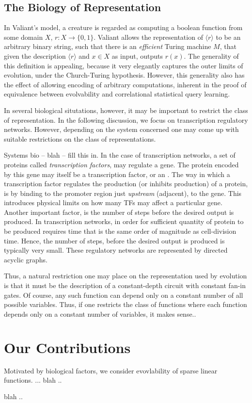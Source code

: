 \subsection{The Biology of Representation}

In Valiant's model, a creature is regarded as computing a boolean function from
some domain $X$, $r : X \rightarrow \{0, 1\}$. Valiant allows the representation
of $\langle r \rangle$ to be an arbitrary binary string, such that there is an
\emph{efficient} Turing machine $M$, that given the description $\langle r
\rangle$ and $x \in X$ as input, outputs $r(x)$. The generality of this
definition is appealing, because it very elegantly captures the outer limits of
evolution, under the Church-Turing hypothesis. However, this generality also has
the effect of allowing encoding of arbitrary computations, inherent in the proof
of equivalence between evolvability and correlational statistical query
learning.

In several biological situtations, however, it may be important to restrict the
class of representation. In the following discussion, we focus on transcription
regulatory networks. However, depending on the system concerned one may come up
with suitable restrictions on the class of representations.

Systems bio -- blah -- fill this in. In the case of transcription networks, a
set of proteins called \emph{transcription factors}, may regulate a gene. The
protein encoded by this gene may itself be a transcription factor, or an
. The way in which a transcription factor regulates the
production (or inhibits production) of a protein, is by binding to the promoter
region just \emph{upstream} (adjacent), to the gene. This introduces physical
limits on how many TFs may affect a particular gene. Another important factor,
is the number of steps before the desired output is produced. In transcription
networks, in order for sufficient quantity of protein to be produced requires
time that is the same order of magnitude as cell-division time. Hence, the
number of steps, before the desired output is produced is typically very small.
These regulatory networks are represented by directed acyclic graphs. 

Thus, a natural restriction one may place on the representation used by
evolution is that it must be the description of a constant-depth circuit with
constant fan-in gates. Of course, any such function can depend only on a
constant number of all possible variables. Thus, if one restricts the class of
functions where each function depends only on a constant number of variables, it
makes sense.. 

\section{Our Contributions}

Motivated by biological factors, we consider evovlability of sparse linear
functions. ... blah .. 

blah .. 


